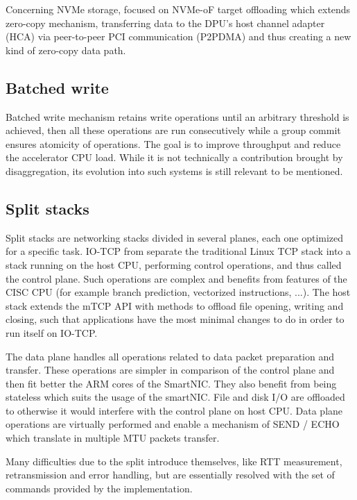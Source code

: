 \documentclass[11pt, a4paper]{article}
\begin{document}
Concerning NVMe storage,  focused on NVMe-oF target offloading which extends zero-copy mechanism,
transferring data to the DPU's host channel adapter (HCA) via peer-to-peer PCI communication (P2PDMA) and thus creating a new
kind of zero-copy data path.

\subsection{Batched write}

Batched write mechanism retains write operations until an arbitrary threshold is achieved, then all these operations are run
consecutively while a group commit ensures atomicity of operations. The goal is to improve throughput and reduce the accelerator
CPU load. While it is not technically a contribution brought by disaggregation, its evolution into such systems is still relevant
to be mentioned.

\subsection{Split stacks}

Split stacks are networking stacks divided in several planes, each one optimized for a specific task. IO-TCP from
 separate the traditional Linux TCP stack into a stack running on the host CPU, performing
control operations, and thus called the control plane. Such operations are complex and benefits from features of the CISC CPU
(for example branch prediction, vectorized instructions, ...). The host stack extends the mTCP \cite{jeong_mtcp_2014} API with methods to offload
file opening, writing and closing, such that applications have the most minimal changes to do in order to run itself on IO-TCP.

The data plane handles all operations related to data packet preparation and transfer. These operations are simpler in comparison
of the control plane and then fit better the ARM cores of the SmartNIC. They also benefit from being stateless which suits the
usage of the smartNIC. File and disk I/O are offloaded to otherwise it would interfere with the control plane on host CPU.
Data plane operations are virtually performed and enable a mechanism of SEND / ECHO which translate in multiple MTU packets
transfer.

Many difficulties due to the split introduce themselves, like RTT measurement, retransmission and error handling, but are
essentially resolved with the set of commands provided by the implementation.
\end{document}
